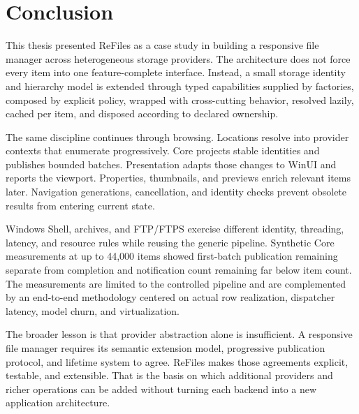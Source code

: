 \documentclass[10pt,a4paper,twoside]{article}
\begin{document}
\section{Conclusion}
\label{section:conclusion}

This thesis presented ReFiles as a case study in building a responsive file manager across heterogeneous storage
providers. The architecture does not force every item into one feature-complete interface. Instead, a small
storage identity and hierarchy model is extended through typed capabilities supplied by factories, composed by
explicit policy, wrapped with cross-cutting behavior, resolved lazily, cached per item, and disposed according to
declared ownership.

The same discipline continues through browsing. Locations resolve into provider contexts that enumerate
progressively. Core projects stable identities and publishes bounded batches. Presentation adapts those changes
to WinUI and reports the viewport. Properties, thumbnails, and previews enrich relevant items later. Navigation
generations, cancellation, and identity checks prevent obsolete results from entering current state.

Windows Shell, archives, and FTP/FTPS exercise different identity, threading, latency, and resource rules while
reusing the generic pipeline. Synthetic Core measurements at up to 44,000 items showed first-batch publication
remaining separate from completion and notification count remaining far below item count. The measurements are
limited to the controlled pipeline and are complemented by an end-to-end methodology centered on actual row
realization, dispatcher latency, model churn, and virtualization.

The broader lesson is that provider abstraction alone is insufficient. A responsive file manager requires its
semantic extension model, progressive publication protocol, and lifetime system to agree. ReFiles makes those
agreements explicit, testable, and extensible. That is the basis on which additional providers and richer
operations can be added without turning each backend into a new application architecture.
\end{document}
